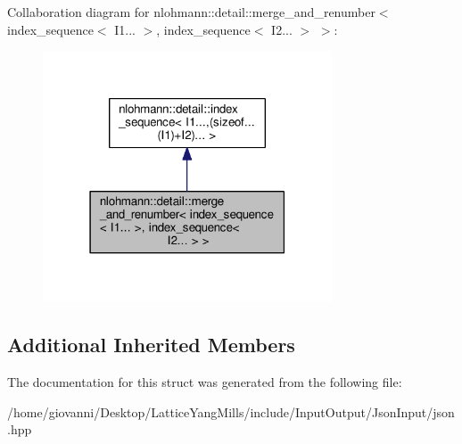 Collaboration diagram for nlohmann\+:\+:detail\+:\+:merge\+\_\+and\+\_\+renumber$<$ index\+\_\+sequence$<$ I1... $>$, index\+\_\+sequence$<$ I2... $>$ $>$\+:\nopagebreak
\begin{figure}[H]
\begin{center}
\leavevmode
\includegraphics[width=243pt]{structnlohmann_1_1detail_1_1merge__and__renumber_3_01index__sequence_3_01I1_8_8_8_01_4_00_01inde1bac35fd5e769bd829866cd5fef35c22}
\end{center}
\end{figure}
\subsection*{Additional Inherited Members}


The documentation for this struct was generated from the following file\+:\begin{DoxyCompactItemize}
\item 
/home/giovanni/\+Desktop/\+Lattice\+Yang\+Mills/include/\+Input\+Output/\+Json\+Input/json.\+hpp\end{DoxyCompactItemize}
